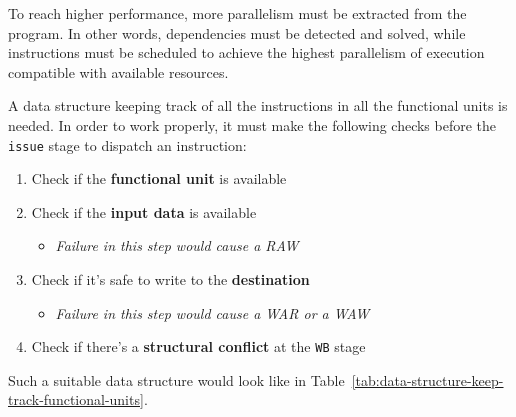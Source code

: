 \documentclass[english]{article}
\begin{document}
To reach higher performance, more parallelism must be extracted from the program.
In other words, dependencies must be detected and solved, while instructions must be scheduled to achieve the highest parallelism of execution compatible with available resources.

A data structure keeping track of all the instructions in all the functional units is needed.
In order to work properly, it must make the following checks before the \texttt{issue} stage to dispatch an instruction:

\begin{enumerate}
  \item Check if the \textbf{functional unit} is available
  \item Check if the \textbf{input data} is available
        \begin{itemize}
          \item \textit{Failure in this step would cause a RAW}
        \end{itemize}
  \item Check if it's safe to write to the \textbf{destination}
        \begin{itemize}
          \item \textit{Failure in this step would cause a WAR or a WAW}
        \end{itemize}
  \item Check if there's a \textbf{structural conflict} at the \texttt{WB} stage
\end{enumerate}

Such a suitable data structure would look like in Table~\ref{tab:data-structure-keep-track-functional-units}.
\end{document}
